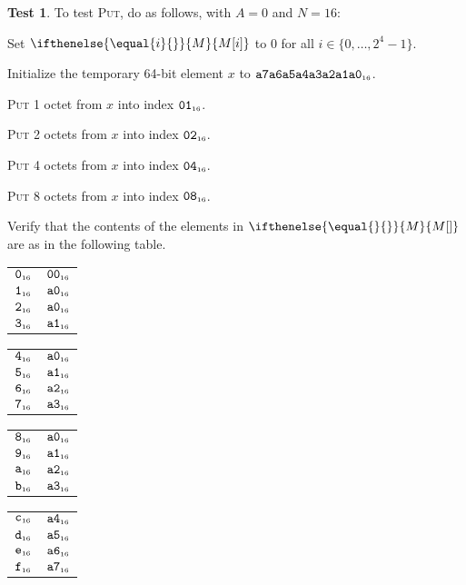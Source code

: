 \documentclass[a4paper,12pt]{article}
\makeatletter
\newcommand{\num}[1]{\texttt{\MakeLowercase{#1}}}
\newcommand{\hex}[1]{\num{#1}_{\textup{\tiny 16}}}
\newcommand{\MEM}[1]{\ifthenelse{\equal{#1}{}}{M}{M[#1]}}
\newcommand{\range}[2]{\{#1,\ldots,#2\}}
\newcommand{\proc}[1]{\textsc{#1}}
\theoremstyle{definition}
\newtheorem{test}{Test}
\newenvironment{memtable}{%
  \begin{trivlist}
    \item
    }{%
    \end{trivlist}}
\newenvironment{memcolumn}{%
  \begin{tabular}{@{}ll@{}}
    \hline}
    {%
    \hline
  \end{tabular}}
\newcommand{\memspace}{\qquad}
\makeatother
\begin{document}
\begin{test}
  To test \proc{Put}, do as follows, with $A=0$ and $N=16$:
  \begin{stepnumbers}
  \item Set $\MEM{i}$ to 0 for all $i \in \range{0}{2^4-1}$.
  \item Initialize the temporary 64-bit element $x$ to $\hex{A7A6A5A4A3A2A1A0}$.
  \item \proc{Put} 1 octet  from $x$ into index $\hex{01}$.
  \item \proc{Put} 2 octets from $x$ into index $\hex{02}$.
  \item \proc{Put} 4 octets from $x$ into index $\hex{04}$.
  \item \proc{Put} 8 octets from $x$ into index $\hex{08}$.
  \item Verify that the contents of the elements in $\MEM{}$ are as in the following table.
  \end{stepnumbers}

  \begin{memtable}
    \begin{memcolumn}
      $\hex{0}$ & $\hex{00}$ \\
      $\hex{1}$ & $\hex{A0}$ \\
      $\hex{2}$ & $\hex{A0}$ \\
      $\hex{3}$ & $\hex{A1}$ \\
    \end{memcolumn}
    \memspace
    \begin{memcolumn}
      $\hex{4}$ & $\hex{A0}$ \\
      $\hex{5}$ & $\hex{A1}$ \\
      $\hex{6}$ & $\hex{A2}$ \\
      $\hex{7}$ & $\hex{A3}$ \\
    \end{memcolumn}
    \memspace
    \begin{memcolumn}
      $\hex{8}$ & $\hex{A0}$ \\
      $\hex{9}$ & $\hex{A1}$ \\
      $\hex{A}$ & $\hex{A2}$ \\
      $\hex{B}$ & $\hex{A3}$ \\
    \end{memcolumn}
    \memspace
    \begin{memcolumn}
      $\hex{C}$ & $\hex{A4}$ \\
      $\hex{D}$ & $\hex{A5}$ \\
      $\hex{E}$ & $\hex{A6}$ \\
      $\hex{F}$ & $\hex{A7}$ \\
    \end{memcolumn}
  \end{memtable}
\end{test}
\end{document}
